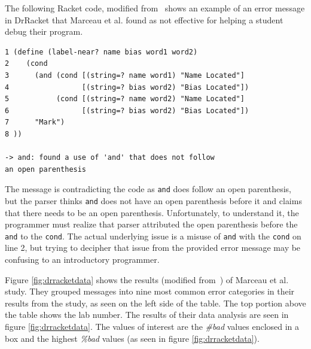 \documentclass{sig-alternate}
\begin{document}
The following Racket code, modified from~\cite{Marceau:2011:MEE:1953163.1953308}  shows an example of an error message in DrRacket that Marceau et al. found as not effective for helping a student debug their program.

\begin{verbatim}
1 (define (label-near? name bias word1 word2)
2    (cond
3      (and (cond [(string=? name word1) "Name Located"]
4                 [(string=? bias word2) "Bias Located"])
5           (cond [(string=? name word2) "Name Located"]
6                 [(string=? bias word2) "Bias Located"])
7      "Mark")
8 ))

-> and: found a use of 'and' that does not follow 
an open parenthesis
\end{verbatim}

The message is contradicting the code as \texttt{and} does follow an open parenthesis, but the parser thinks \texttt{and} does not have an open parenthesis before it and claims that there needs to be an open parenthesis.
Unfortunately, to understand it, the programmer must realize that parser attributed the open parenthesis before the \texttt{and} to the \texttt{cond}.
The actual underlying issue is a misuse of \texttt{and} with the \texttt{cond} on line 2, but trying to decipher that issue from the provided error message may be confusing to an introductory programmer.



Figure \ref{fig:drracketdata} shows the results (modified from~\cite{Marceau:2011:MEE:1953163.1953308}) of Marceau et al. study. 
They grouped messages into nine most common error categories in their results from the study, as seen on the left side of the table.
The top portion above the table shows the lab number.
The results of their data analysis are seen in figure \ref{fig:drracketdata}.
The values of interest are the \textit{\#bad} values enclosed in a box and the highest \textit{\%bad} values (as seen in figure \ref{fig:drracketdata}). 
\end{document}
